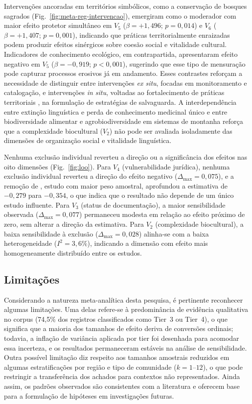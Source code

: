 \documentclass[12pt,a4paper]{article}
\begin{document}
Intervenções ancoradas em territórios simbólicos, como a conservação de bosques sagrados (Fig.~\ref{fig:meta-reg-intervencao}), emergiram como o moderador com maior efeito protetor simultâneo em $V_5$ ($\beta = +1{,}496$; $p = 0{,}014$) e $V_6$ ($\beta = +1{,}407$; $p = 0{,}001$), indicando que práticas territorialmente enraizadas podem produzir efeitos sinérgicos sobre coesão social e vitalidade cultural. Indicadores de conhecimento ecológico, em contrapartida, apresentaram efeito negativo em $V_5$ ($\beta = -0{,}919$; $p < 0{,}001$), sugerindo que esse tipo de mensuração pode capturar processos erosivos já em andamento. Esses contrastes reforçam a necessidade de distinguir entre intervenções \textit{ex situ}, focadas em monitoramento e catalogação, e intervenções \textit{in situ}, voltadas ao fortalecimento de práticas territoriais \citep{Zimmerer2018}, na formulação de estratégias de salvaguarda. A interdependência entre extinção linguística e perda de conhecimento medicinal único \citep{CamaraLeret2021} e entre biodiversidade alimentar e agrobiodiversidade em sistemas de montanha \citep{Zimmerer2018} reforça que a complexidade biocultural ($V_2$) não pode ser avaliada isoladamente das dimensões de organização social e vitalidade linguística.

Nenhuma exclusão individual reverteu a direção ou a significância dos efeitos nas oito dimensões (Fig.~\ref{fig:loo}). Para $V_4$ (vulnerabilidade jurídica), nenhuma exclusão individual reverteu a direção do efeito negativo ($\Delta_{\max} = 0{,}075$), e a remoção de \citet{Sibanda2025}, estudo com maior peso amostral, aprofundou a estimativa de $-0{,}279$ para $-0{,}354$, o que indica que o resultado não depende de um único estudo influente. Para $V_3$ (status de documentação), a maior sensibilidade observada ($\Delta_{\max} = 0{,}077$) permaneceu modesta em relação ao efeito próximo de zero, sem alterar a direção da estimativa. Para $V_2$ (complexidade biocultural), a baixa sensibilidade à exclusão ($\Delta_{\max} = 0{,}028$) alinha-se com a baixa heterogeneidade ($I^2 = 3{,}6\%$), indicando a dimensão com efeito mais homogeneamente distribuído entre os estudos.

\subsection{Limitações}
\label{sec:limitations}

Considerando a natureza meta-analítica desta pesquisa, é pertinente reconhecer algumas limitações. Uma delas refere-se à predominância de evidência qualitativa no corpus (74,5\% dos registros classificados como Tier~3 ou Tier~4), o que significa que a maioria dos tamanhos de efeito deriva de conversões ordinais; todavia, a inflação de variância aplicada por tier foi desenhada para acomodar essa incerteza, e os resultados permaneceram estáveis na análise de sensibilidade. Outra possível limitação diz respeito aos tamanhos amostrais reduzidos em algumas estratificações por região e tipo de comunidade ($k = 1$--$12$), o que pode restringir a transferência dos achados para contextos não representados. Ainda assim, os padrões observados são consistentes com a literatura e oferecem base para a formulação de hipóteses em investigações futuras.
\end{document}
